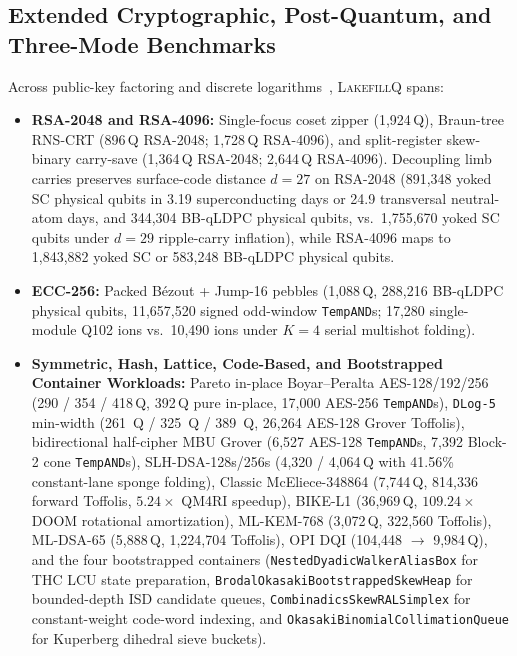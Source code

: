 \documentclass[acmsmall,screen,anonymous]{acmart}
\DeclareRobustCommand{\_}{\ifmmode\text{\char95}\else\char95\penalty0\relax\fi}
\theoremstyle{plain}
\newcommand{\LakefillQ}{\textsc{LakefillQ}}
\begin{document}
\subsection{Extended Cryptographic, Post-Quantum, and Three-Mode Benchmarks}

Across public-key factoring and discrete logarithms~\cite{ekera2017,gidneyekera2021,regev2023,gouzien2023,chevignard2024,gidneyshutty2024,khattar2025}, \LakefillQ{} spans:
\begin{itemize}
  \item \textbf{RSA-2048 and RSA-4096:} Single-focus coset zipper (1,924\,Q), Braun-tree RNS-CRT (896\,Q RSA-2048; 1,728\,Q RSA-4096), and split-register skew-binary carry-save (1,364\,Q RSA-2048; 2,644\,Q RSA-4096). Decoupling limb carries preserves surface-code distance $d=27$ on RSA-2048 (891,348 yoked SC physical qubits in 3.19 superconducting days or 24.9 transversal neutral-atom days, and 344,304 BB-qLDPC physical qubits, vs.\ 1,755,670 yoked SC qubits under $d=29$ ripple-carry inflation), while RSA-4096 maps to 1,843,882 yoked SC or 583,248 BB-qLDPC physical qubits.
  \item \textbf{ECC-256:} Packed B\'{e}zout + Jump-16 pebbles (1,088\,Q, 288,216 BB-qLDPC physical qubits, 11,657,520 signed odd-window \texttt{TempAND}s; 17,280 single-module Q102 ions vs.\ 10,490 ions under $K=4$ serial multishot folding).
  \item \textbf{Symmetric, Hash, Lattice, Code-Based, and Bootstrapped Container Workloads:} Pareto in-place Boyar--Peralta AES-128/192/256 (290 / 354 / 418\,Q, 392\,Q pure in-place, 17,000 AES-256 \texttt{TempAND}s), \texttt{DLog-5} min-width (261~Q / 325~Q / 389~Q, 26,264 AES-128 Grover Toffolis), bidirectional half-cipher MBU Grover (6,527 AES-128 \texttt{TempAND}s, 7,392 Block-2 cone \texttt{TempAND}s), SLH-DSA-128s/256s (4,320 / 4,064\,Q with 41.56\% constant-lane sponge folding), Classic McEliece-348864 (7,744\,Q, 814,336 forward Toffolis, $5.24\times$ QM4RI speedup), BIKE-L1 (36,969\,Q, $109.24\times$ DOOM rotational amortization), ML-KEM-768 (3,072\,Q, 322,560 Toffolis), ML-DSA-65 (5,888\,Q, 1,224,704 Toffolis), OPI DQI (104,448 $\to$ 9,984\,Q), and the four bootstrapped containers (\texttt{NestedDyadicWalkerAliasBox} for THC LCU state preparation, \texttt{BrodalOkasakiBootstrappedSkewHeap} for bounded-depth ISD candidate queues, \texttt{CombinadicsSkewRALSimplex} for constant-weight code-word indexing, and \texttt{OkasakiBinomialCollimationQueue} for Kuperberg dihedral sieve buckets).
\end{itemize}
\end{document}
